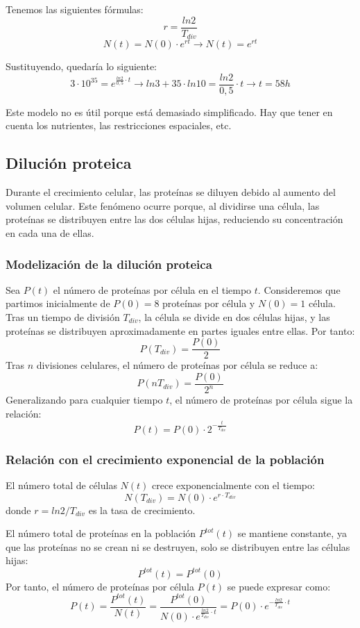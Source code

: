 Tenemos las siguientes fórmulas:
$$r = \frac{ln 2}{T_{div}} $$
$$N(t) = N(0) \cdot e^{rt} \rightarrow N(t) = e^{rt}$$

Sustituyendo, quedaría lo siguiente:
$$3 \cdot 10^{35} = e^{\frac{ln 2}{0,5} \cdot t} \rightarrow ln 3 + 35 \cdot ln 10 = \frac{ln 2}{0,5} \cdot t \rightarrow t = 58 h$$

Este modelo no es útil porque está demasiado simplificado. Hay que tener en cuenta los nutrientes, las restricciones espaciales, etc. 

\subsection{Dilución proteica}
Durante el crecimiento celular, las proteínas se diluyen debido al aumento del volumen celular. Este fenómeno ocurre porque, al dividirse una célula, las proteínas se distribuyen entre las dos células hijas, reduciendo su concentración en cada una de ellas.

\subsubsection{Modelización de la dilución proteica}
Sea $P(t)$ el número de proteínas por célula en el tiempo $t$. Consideremos que partimos inicialmente de $P(0) = 8$ proteínas por célula y $N(0) = 1$ célula. 
Tras un tiempo de división $T_{div}$, la célula se divide en dos células hijas, y las proteínas se distribuyen aproximadamente en partes iguales entre ellas. Por tanto:
$$P(T_{div}) = \frac{P(0)}{2}$$
Tras $n$ divisiones celulares, el número de proteínas por célula se reduce a:
$$P(nT_{div}) = \frac{P(0)}{2^n}$$
Generalizando para cualquier tiempo $t$, el número de proteínas por célula sigue la relación:
$$P(t) = P(0) \cdot 2^{-\frac{t}{T_{div}}}$$

\subsubsection{Relación con el crecimiento exponencial de la población}
El número total de células $N(t)$ crece exponencialmente con el tiempo:
$$N(T_{div}) = N(0) \cdot e^{r \cdot T_{div}}$$
donde $r = ln 2 / T_{div}$ es la tasa de crecimiento. 

El número total de proteínas en la población $P^{tot}(t)$ se mantiene constante, ya que las proteínas no se crean ni se destruyen, solo se distribuyen entre las células hijas:
$$P^{tot}(t) = P^{tot}(0)$$
Por tanto, el número de proteínas por célula $P(t)$ se puede expresar como:
$$P(t) = \frac{P^{tot}(t)}{N(t)} = \frac{P^{tot} (0)}{N(0) \cdot e^{\frac{ln 2}{T_{div}} \cdot t}} = P(0) \cdot e^{-\frac{ln 2}{T_{div}} \cdot t}$$


